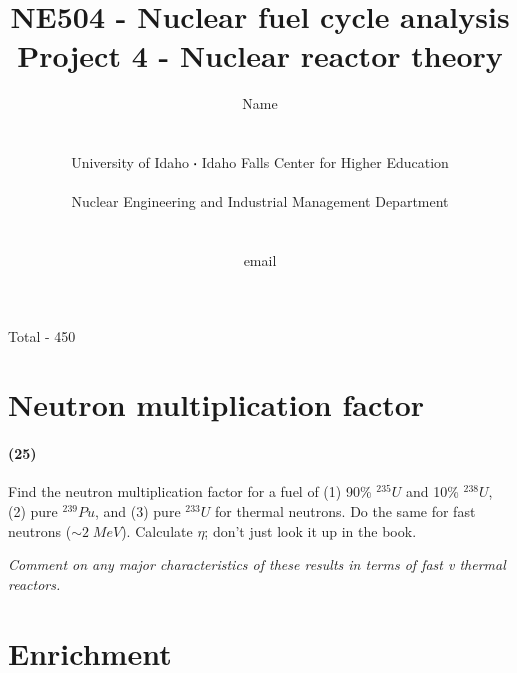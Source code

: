 \documentclass[11pt,a4paper]{article}
\newcommand*\sq{\mathbin{\vcenter{\hbox{\rule{.3ex}{.3ex}}}}} %
\begin{document}
\begin{titlepage}
    \title{
        NE504 - Nuclear fuel cycle analysis\\
        Project 4 - Nuclear reactor theory\\
    }
    \author{
        Name
        \\ \\ \\
        University of Idaho $\sq$ Idaho Falls Center for Higher Education
        \\ \\
        Nuclear Engineering and Industrial Management Department
        \\ \\ \\
        email 
    }
\clearpage %
\maketitle
\vspace*{\fill}
\begin{flushright}{
        Total - 450 
}
\end{flushright}
\thispagestyle{empty} %
\end{titlepage}

\printnoidxglossary

\newpage

\section{Neutron multiplication factor}
\paragraph*{(25)}
Find the neutron multiplication factor for a fuel of (1) 90\% $^{235}U$ and 10\% $^{238}U$, (2) pure $^{239}Pu$, and (3) pure $^{233}U$ for thermal neutrons. Do the same for fast neutrons ($\sim 2 \; MeV$). Calculate $\eta$; don't just look it up in the book. 

\vspace{\baselineskip}

\noindent\textit{Comment on any major characteristics of these results in terms of fast v thermal reactors.}





\newpage

\section{Enrichment}
\end{document}
